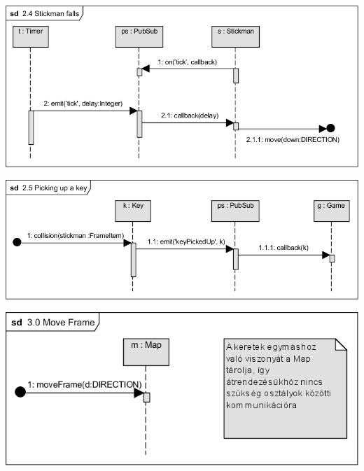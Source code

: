 		\begin{center}\includegraphics[scale=1]{resources/24Stickmanfalls.png}\end{center}
		\begin{center}\includegraphics[scale=1]{resources/25Pickingupakey.png}\end{center}
		\begin{center}\includegraphics[scale=1]{resources/30MoveFrame.png}\end{center}
